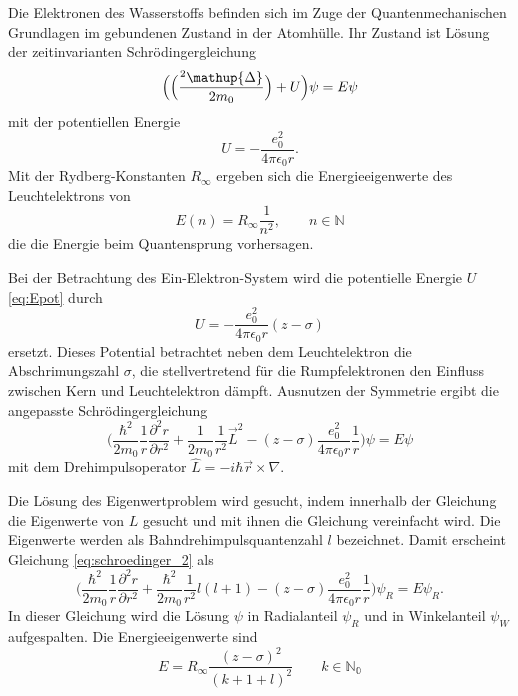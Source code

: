 Die Elektronen des Wasserstoffs befinden sich im Zuge der Quantenmechanischen Grundlagen im gebundenen Zustand in der Atomhülle.
Ihr Zustand ist Lösung der zeitinvarianten Schrödingergleichung
\begin{equation}
	\Bigl(\Bigl(\frac{\hbar^2\mathup{\Delta}}{2 m_0}\Bigr)+U\Bigr)\psi=E\psi
	\label{eq:schroedinger}
\end{equation}
mit der potentiellen Energie 
\begin{equation}
	U=-\frac{e_0^2}{4\pi\epsilon_0 r}.
	\label{eq:Epot}
\end{equation}
Mit der Rydberg-Konstanten $R_\infty$ ergeben sich die Energieeigenwerte des Leuchtelektrons von
\begin{equation}
	E(n)=R_\infty\frac{1}{n^2}, \qquad n\in\mathbb{N}
	\label{eq:EEW}
\end{equation}
die die Energie beim Quantensprung vorhersagen.

Bei der Betrachtung des Ein-Elektron-System wird die potentielle Energie $U$ \eqref{eq:Epot} durch
\begin{equation}
	U=-\frac{e_0^2}{4\pi\epsilon_0 r}(z-\sigma)
	\label{eq:Epot_neu}
\end{equation}
ersetzt.
Dieses Potential betrachtet neben dem Leuchtelektron die Abschrimungszahl $\sigma$, die stellvertretend für die Rumpfelektronen den Einfluss zwischen Kern und Leuchtelektron dämpft.
Ausnutzen der Symmetrie ergibt die angepasste Schrödingergleichung
\begin{equation}
	\biggl(\frac{\hbar^2}{2m_0}\frac{1}{r}\frac{\partial^2 r}{\partial r^2}+\frac{1}{2m_0}\frac{1}{r^2} \vec{L}^2-(z-\sigma)\frac{e_0^2}{4\pi\epsilon_0 r}\frac{1}{r}\biggr)\psi=E\psi
	\label{eq:schroedinger_2}
\end{equation}
mit dem Drehimpulsoperator $\hat{L}=-i\hbar \vec{r}\times\nabla$.

Die Lösung des Eigenwertproblem wird gesucht, indem innerhalb der Gleichung die Eigenwerte von $L$ gesucht und mit ihnen die Gleichung vereinfacht wird.
Die Eigenwerte werden als Bahndrehimpulsquantenzahl $l$ bezeichnet.
Damit erscheint Gleichung \eqref{eq:schroedinger_2} als
\begin{equation}
	\biggl(\frac{\hbar^2}{2m_0}\frac{1}{r}\frac{\partial^2 r}{\partial r^2}+\frac{\hbar^2}{2m_0}\frac{1}{r^2} l(l+1)-(z-\sigma)\frac{e_0^2}{4\pi\epsilon_0 r}\frac{1}{r}\biggr)\psi_R=E\psi_R.
	\label{eq:EEW_drehimpuls_flasche}
\end{equation}
In dieser Gleichung wird die Lösung $\psi$ in Radialanteil $\psi_R$ und in Winkelanteil $\psi_W$ aufgespalten. 
Die Energieeigenwerte sind
\begin{equation}
	E=R_\infty\frac{(z-\sigma)^2}{(k+1+l)^2} \qquad k\in\mathbb{N_0}
	\label{eq:EEW_drehimpuls}
\end{equation}


